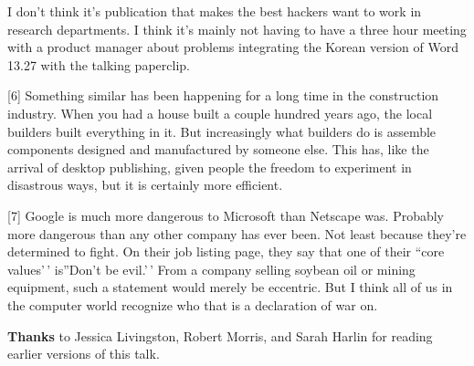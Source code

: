 I don't think it's publication that makes the best hackers want to work
in research departments. I think it's mainly not having to have a three
hour meeting with a product manager about problems integrating the
Korean version of Word 13.27 with the talking paperclip.

{[}6{]} Something similar has been happening for a long time in the
construction industry. When you had a house built a couple hundred years
ago, the local builders built everything in it. But increasingly what
builders do is assemble components designed and manufactured by someone
else. This has, like the arrival of desktop publishing, given people the
freedom to experiment in disastrous ways, but it is certainly more
efficient.

{[}7{]} Google is much more dangerous to Microsoft than Netscape was.
Probably more dangerous than any other company has ever been. Not least
because they're determined to fight. On their job listing page, they say
that one of their ``core values'\,' is''Don't be evil.'\,' From a
company selling soybean oil or mining equipment, such a statement would
merely be eccentric. But I think all of us in the computer world
recognize who that is a declaration of war on.

\textbf{Thanks} to Jessica Livingston, Robert Morris, and Sarah Harlin
for reading earlier versions of this talk.
